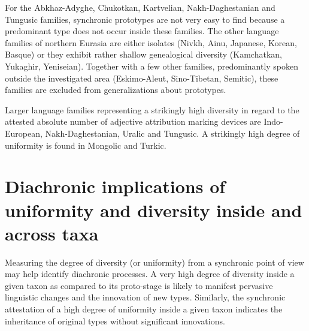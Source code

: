 For the Abkhaz-Adyghe, Chukotkan, Kartvelian, Nakh-Daghestanian and Tungusic families, synchronic prototypes are not very easy to find because a predominant type does not occur inside these families. The other language families of northern Eurasia are either isolates (Nivkh, Ainu, Japanese, Korean, Basque) or they exhibit rather shallow genealogical diversity (Kamchatkan, Yukaghir, Yeniseian). Together with a few other families, predominantly spoken outside the investigated area (Eskimo-Aleut, Sino-Tibetan, Semitic), these families are excluded from generalizations about prototypes. 

Larger language families representing a strikingly high diversity in regard to the attested absolute number of adjective attribution marking devices are Indo-European, Nakh-Daghestanian, Uralic and Tungusic. A strikingly high degree of uniformity is found in Mongolic and Turkic.

\section[Diachronic implications]{Diachronic implications of uniformity and diversity inside and across taxa}
Measuring the degree of diversity (or uniformity) from a synchronic point of view may help identify diachronic processes. A very high degree of diversity inside a given taxon as compared to its proto-stage is likely to manifest pervasive linguistic changes and the innovation of new types. Similarly, the synchronic attestation of a high degree of uniformity inside a given taxon indicates the inheritance of original types without significant innovations. 

